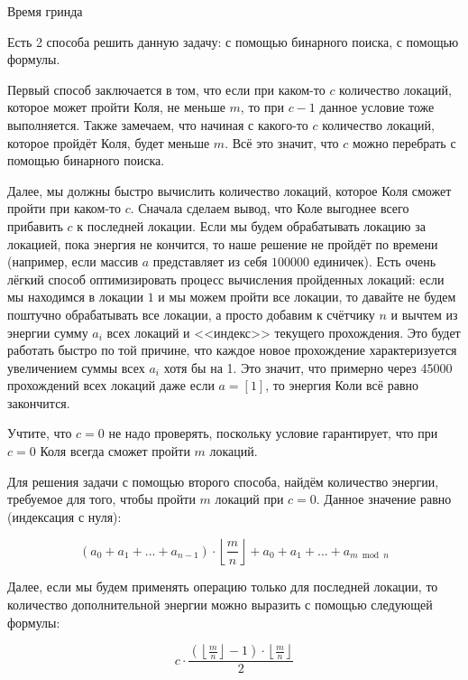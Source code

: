\begin{tutorial}{Время гринда}

Есть 2 способа решить данную задачу: с помощью бинарного поиска, с помощью формулы.

Первый способ заключается в том, что если при каком-то $c$ количество локаций, которое может пройти Коля, не меньше $m$, то при $c - 1$ данное условие тоже выполняется. Также замечаем, что начиная с какого-то $c$ количество локаций, которое пройдёт Коля, будет меньше $m$. Всё это значит, что $c$ можно перебрать с помощью бинарного поиска.

Далее, мы должны быстро вычислить количество локаций, которое Коля сможет пройти при каком-то $c$. Сначала сделаем вывод, что Коле выгоднее всего прибавить $c$ к последней локации. Если мы будем обрабатывать локацию за локацией, пока энергия не кончится, то наше решение не пройдёт по времени (например, если массив $a$ представляет из себя $100000$ единичек). Есть очень лёгкий способ оптимизировать процесс вычисления пройденных локаций: если мы находимся в локации $1$ и мы можем пройти все локации, то давайте не будем поштучно обрабатывать все локации, а просто добавим к счётчику $n$ и вычтем из энергии сумму $a_i$ всех локаций и <<индекс>> текущего прохождения. Это будет работать быстро по той причине, что каждое новое прохождение характеризуется увеличением суммы всех $a_i$ хотя бы на 1. Это значит, что примерно через 45000 прохождений всех локаций даже если $a = [1]$, то энергия Коли всё равно закончится.

Учтите, что $c = 0$ не надо проверять, поскольку условие гарантирует, что при $c = 0$ Коля всегда сможет пройти $m$ локаций.

Для решения задачи с помощью второго способа, найдём количество энергии, требуемое для того, чтобы пройти $m$ локаций при $c = 0$. Данное значение равно (индексация с нуля):

\begin{equation}
\left( a_0 + a_1 + ... + a_{n-1} \right) \cdot \left\lfloor \frac{m}{n} \right\rfloor + a_0 + a_1 + ... + a_{m \bmod{n}} %
\end{equation}

Далее, если мы будем применять операцию только для последней локации, то количество дополнительной энергии можно выразить с помощью следующей формулы:

\begin{equation}
c \cdot \frac{\left( \left\lfloor \frac{m}{n} \right\rfloor - 1 \right) \cdot \left\lfloor \frac{m}{n} \right\rfloor}{2} %
\end{equation}


\end{tutorial}
